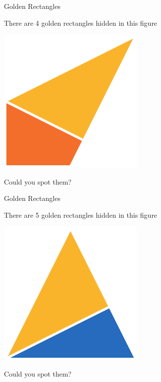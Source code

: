 \documentclass[14pt]{beamer}
\begin{document}

    \begin{frame}{Golden Rectangles}
        \begin{center}
            There are 4 golden rectangles hidden in this figure

            \bigskip\bigskip

            \includegraphics[scale=1.0]{figures/figure020i.pdf} \\

            \bigskip

            Could you spot them?
        \end{center}
    \end{frame}


    \begin{frame}{Golden Rectangles}
        \begin{center}
            There are 5 golden rectangles hidden in this figure

            \bigskip\bigskip

            \includegraphics[scale=1.0]{figures/figure020g.pdf} \\

            \bigskip

            Could you spot them?
        \end{center}
    \end{frame}
\end{document}
